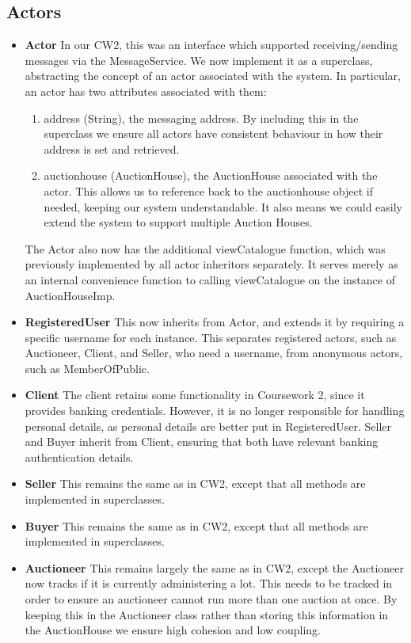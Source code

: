 \documentclass[titlepage, 12pt]{extarticle}
\begin{document}
\subsection{Actors}
\begin{itemize}
    \item {\bf Actor} In our CW2, this was an interface which supported
        receiving/sending messages via the MessageService. We now implement it
        as a superclass, abstracting the concept of an actor associated with
        the system. In particular, an actor has two attributes associated with
        them:
        \begin{enumerate}
            \item address (String), the messaging address. By including this in
                the superclass we ensure all actors have consistent behaviour in
                how their address is set and retrieved.
            \item auctionhouse (AuctionHouse), the AuctionHouse associated with
              the actor. This allows us to reference back to the auctionhouse object if needed,
              keeping our system understandable. It also means we could easily extend the system to
              support multiple Auction Houses. 
        \end{enumerate}
        The Actor also now has the additional viewCatalogue function, which was
        previously implemented by all actor inheritors separately. It serves
        merely as an internal convenience function to calling viewCatalogue on
        the instance of AuctionHouseImp.
    \item {\bf RegisteredUser} This now inherits from Actor, and extends it by
        requiring a specific username for each instance. This separates
        registered actors, such as Auctioneer, Client, and Seller, who need a
        username, from anonymous actors, such as MemberOfPublic.
    \item {\bf Client} The client retains some functionality in Coursework 2,
        since it provides banking credentials. However, it is no longer responsible
        for handling personal details, as personal details are better put in
        RegisteredUser. Seller and Buyer inherit from Client, ensuring that both
        have relevant banking authentication details.
    \item {\bf Seller} This remains the same as in CW2, except that all methods
        are implemented in superclasses.
    \item {\bf Buyer} This remains the same as in CW2, except that all methods
        are implemented in superclasses. 
    \item {\bf Auctioneer} This remains largely the same as in CW2, except the
        Auctioneer now tracks if it is currently administering a lot. This needs
        to be tracked in order to ensure an auctioneer cannot run more than one
        auction at once. By keeping this in the Auctioneer class rather than
        storing this information in the AuctionHouse we ensure high cohesion
        and low coupling.
\end{itemize}
\end{document}
